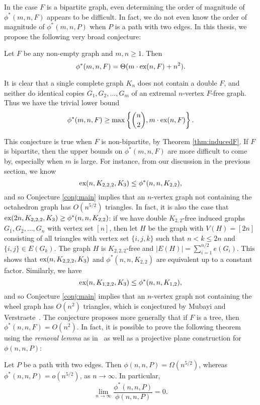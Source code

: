 In the case $F$ is a bipartite graph, even determining the order of magnitude of $\phi^*(m, n, F)$ appears to be difficult. In fact, we do not even know the order of magnitude of $\phi^*(m, n, P)$ when $P$ is a path with two edges. In this thesis, we propose the following very broad conjecture:

\begin{conjecture}\label{conj:main}
Let $F$ be any non-empty graph and $m, n \geq 1$. Then 
\[ 
  \phi^*(m, n, F) = \Theta(m \cdot \textnormal{ex}(n, F) + n^2).
\]
\end{conjecture}

It is clear that a single complete graph $K_n$ does not contain a double $F$, and neither do identical copies $G_1, G_2, \dots, G_m$ of an extremal $n$-vertex $F$-free graph. Thus we have the trivial lower bound 
\[ 
  \phi^*(m, n, F) \geq \max\left\{\binom{n}{2}, m \cdot \textnormal{ex}(n, F)\right\}.
\]

This conjecture is true when $F$ is non-bipartite, by Theorem \ref{thm:inducedF}. If $F$ is bipartite, then the upper bounds on $\phi^*(m, n, F)$ are more difficult to come by, especially when $m$ is large. For instance, from our discussion in the previous section, we know 
\[ 
  \textnormal{ex}(n, K_{2,2,2}, K_3) \leq \phi^*(n, n, K_{2,2}),
\]
and so Conjecture \ref{conj:main} implies that an $n$-vertex graph not containing the octahedron graph has $O(n^{5/2})$ triangles. In fact, it is also the case that $\textnormal{ex}(2n, K_{2,2,2}, K_3) \geq \phi^*(n, n, K_{2,2})$: if we have double $K_{2,2}$-free induced graphs $G_1, G_2, \dots, G_{n}$ with vertex set $[n]$, then let $H$ be the graph with $V(H) = [2n]$ consisting of all triangles with vertex set $\{i, j, k\}$ such that $n < k \leq 2n$ and $\{i, j\} \in E(G_k)$. The graph $H$ is $K_{2, 2, 2}$-free and $|E(H)| = \sum_{i = 1}^{n/2} e(G_i)$. This shows that $\textnormal{ex}(n, K_{2,2,2}, K_3)$ and $\phi^*(n, n, K_{2,2})$ are equivalent up to a constant factor. Similarly, we have
\[ 
  \textnormal{ex}(n, K_{1, 2, 2}, K_3) \leq \phi^*(n, n, K_{1,2}),
\]
and so Conjecture \ref{conj:main} implies that an $n$-vertex graph not containing the wheel graph has $O(n^{2})$ triangles, which is conjectured by Mubayi and Verstraete~\cite{MubayiV2016}. The conjecture proposes more generally that if $F$ is a tree, then $\phi^*(n, n, F) = O(n^2)$. In fact, it is possible to prove the following theorem using the \textit{removal lemma} as in~\cite{MubayiMukherjee2023} as well as a projective plane construction for $\phi(n, n, P)$:

\begin{theorem}\label{thm:inducedP}
Let $P$ be a path with two edges. Then $\phi(n, n, P) = \Omega(n^{5/2})$, whereas $\phi^*(n, n, P) = o(n^{5/2})$, as $n \rightarrow \infty$. In particular, 
\[ 
  \lim_{n \rightarrow \infty} \frac{\phi^*(n, n, P)}{\phi(n, n, P)} = 0.
\]
\end{theorem}

